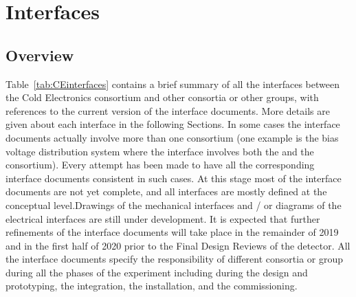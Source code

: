 \section{Interfaces}
\label{sec:fdsp-tpcelec-interfaces}

\subsection{Overview}
\label{sec:fdsp-tpcelec-interfaces-overview}

Table~\ref{tab:CEinterfaces} contains a brief summary of all the interfaces
between the Cold Electronics consortium and other consortia or other groups,
with references to the current version of the interface documents. More
details are given about each interface in the following Sections.
In some cases the interface documents actually involve more than one 
consortium (one example is the bias voltage distribution system where
the interface involves both the  and the  consortium).
Every attempt has been made to have all the corresponding interface documents 
consistent in such cases. At this stage most of the interface documents are
not yet complete, and all interfaces are mostly defined at the conceptual
level.Drawings of the mechanical interfaces and / or diagrams
of the electrical interfaces are still under development. It is expected 
that further refinements of the interface documents will take place in the
remainder of 2019 and in the first half of 2020 prior to the Final Design
Reviews of the detector. All the interface documents specify the responsibility
of different consortia or group during all the phases of the experiment
including during the design and prototyping, the integration, the installation,
and the commissioning.


